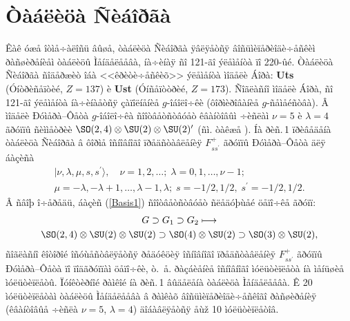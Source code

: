 \section{Òàáëèöà Ñèáîðãà}
Êàê óæå îòìå÷àëîñü âûøå, òàáëèöà Ñèáîðãà ÿâëÿåòñÿ âîñüìèïåðèîäè÷åñêèì ðàñøèðåíèåì òàáëèöû Ìåíäåëååâà, íà÷èíàÿ ñî 121-ãî ýëåìåíòà ïî 220-ûé. Òàáëèöà Ñèáîðãà ñîäåðæèò îáà <<êðèòè÷åñêèõ>> ýëåìåíòà ìîäåëè Áîðà: \textbf{Uts} (Óíòðèñåïòèé, $Z=137$) è \textbf{Ust} (Óíñåïòòðèé, $Z=173$). Ñîãëàñíî ìîäåëè Áîðà, ñî 121-ãî ýëåìåíòà íà÷èíàåòñÿ çàïîëíåíèå $g$-îáîëî÷êè (ôîðìèðîâàíèå $g$-ñåìåéñòâà). Â ìîäåëè Ðóìåðà--Ôåòà \cite{Fet} $g$-îáîëî÷êà ñîîòâåòñòâóåò êâàíòîâûì ÷èñëàì $\nu=5$ è $\lambda=4$ ãðóïïû ñèììåòðèè $\SO(2,4)\otimes\SU(2)\otimes\SU(2)^\prime$ (ñì. òàêæå \cite{Var18}). Íà ðèñ.\,1 ïðèâåäåíà òàáëèöà Ñèáîðãà â ôîðìå îñíîâíîãî ïðåäñòàâëåíèÿ $F^+_{ss^\prime}$ ãðóïïû Ðóìåðà--Ôåòà äëÿ áàçèñà
\begin{multline}
|\nu,\lambda,\mu,s,s^\prime\rangle,\quad \nu=1,2,\ldots;\; \lambda=0,1,\ldots, \nu-1;\\
\mu=-\lambda,-\lambda+1,\ldots,\lambda-1,\lambda;\;s=-1/2,1/2,\;s^\prime=-1/2,1/2.\label{Basis1}
\end{multline}
Â ñâîþ î÷åðåäü, áàçèñ (\ref{Basis1}) ñîîòâåòñòâóåò ñëåäóþùåé öåïî÷êå ãðóïï:
\begin{multline}
G\supset G_1\supset G_2\longmapsto\\
\SO(2,4)\otimes\SU(2)\otimes\SU(2)\supset\SO(4)\otimes\SU(2)\supset\SO(3)\otimes\SU(2),\label{Chain1}
\end{multline}
ñîãëàñíî êîòîðîé îñóùåñòâëÿåòñÿ ðåäóêöèÿ îñíîâíîãî ïðåäñòàâëåíèÿ $F^+_{ss^\prime}$ ãðóïïû Ðóìåðà--Ôåòà ïî ïîäãðóïïàì öåïî÷êè, ò.~å. ðàçáèåíèå îñíîâíîãî ìóëüòèïëåòà íà ìåíüøèå ìóëüòèïëåòû. Ïóíêòèðíîé ðàìêîé íà ðèñ.\,1 âûäåëåíà òàáëèöà Ìåíäåëååâà. Ê 20 ìóëüòèïëåòàì òàáëèöû Ìåíäåëååâà â ðàìêàõ âîñüìèïåðèîäè÷åñêîãî ðàñøèðåíèÿ (êâàíòîâûå ÷èñëà $\nu=5$, $\lambda=4$) äîáàâëÿåòñÿ åùž 10 ìóëüòèïëåòîâ.

